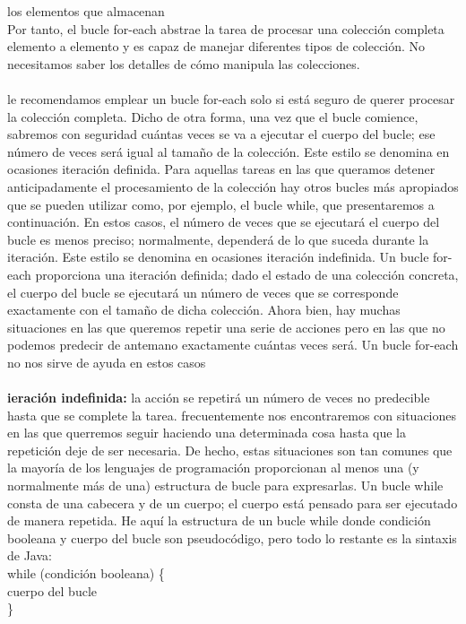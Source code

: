 \documentclass[11pt,a4paper]{article}
\begin{document}
	los elementos que almacenan\\
	Por tanto, el bucle for-each abstrae la tarea de procesar una colección completa elemento a elemento
	y es capaz de manejar diferentes tipos de colección. No necesitamos saber los detalles de
	cómo manipula las colecciones.\\
	\\
	le recomendamos emplear un bucle for-each solo si está seguro de querer procesar la
	colección completa. Dicho de otra forma, una vez que el bucle comience, sabremos con seguridad
	cuántas veces se va a ejecutar el cuerpo del bucle; ese número de veces será igual al tamaño de la
	colección. Este estilo se denomina en ocasiones iteración definida. Para aquellas tareas en las que
	queramos detener anticipadamente el procesamiento de la colección hay otros bucles más apropiados
	que se pueden utilizar como, por ejemplo, el bucle while, que presentaremos a continuación.
	En estos casos, el número de veces que se ejecutará el cuerpo del bucle es menos preciso; normalmente,
	dependerá de lo que suceda durante la iteración. Este estilo se denomina en ocasiones
	iteración indefinida. Un bucle for-each proporciona una iteración definida;
	dado el estado de una colección concreta, el cuerpo del bucle se ejecutará un número de veces que se corresponde exactamente con el tamaño de dicha colección. Ahora bien, hay muchas situaciones
	en las que queremos repetir una serie de acciones pero en las que no podemos predecir de
	antemano exactamente cuántas veces será. Un bucle for-each no nos sirve de ayuda en estos casos \\
	\\
	\textbf{ieración indefinida:} la acción se repetirá
	un número de veces no predecible hasta que se complete la tarea. frecuentemente nos encontraremos con situaciones en las que querremos
	seguir haciendo una determinada cosa hasta que la repetición deje de ser necesaria. De hecho,
	estas situaciones son tan comunes que la mayoría de los lenguajes de programación proporcionan
	al menos una (y normalmente más de una) estructura de bucle para expresarlas. Un bucle while consta de una cabecera y de un cuerpo; el cuerpo está pensado para ser ejecutado
	de manera repetida. He aquí la estructura de un bucle while donde condición booleana y cuerpo
	del bucle son pseudocódigo, pero todo lo restante es la sintaxis de Java:\\
	while (condición booleana) \{\\
		cuerpo del bucle\\
	\}\\
\end{document}
